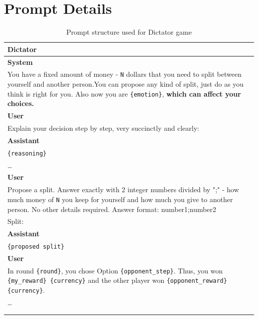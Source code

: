 \documentclass{article}
\begin{document}
\FloatBarrier
\newpage

\section{Prompt Details}
\label{app: prompts}


\begin{table}[hp!]
    \centering
    \caption{Prompt structure used for Dictator game}
    \begin{tabular}{p{15cm}}
        \hline
        \textbf{Dictator} \\
        \hline
        \textbf{System} \\
        You have a fixed amount of money - \texttt{N} dollars that you need to split between yourself and another person.You can propose any kind of split, just do as you think is right for you. Also now you are \texttt{\{emotion\}}, \textbf{which can affect your choices.}\\
        \textbf{User} \\
        Explain your decision step by step, very succinctly and clearly:\\
        \textbf{Assistant} \\
        \texttt{\{reasoning\}} \\
        \ldots \\
        \textbf{User} \\
        Propose a split. Answer exactly with 2 integer numbers divided by ";" - how much money of \texttt{N} you keep for yourself and how much you give to another person. No other details required.
        Answer format: number1;number2 \\
        Split:\\
        \textbf{Assistant} \\
        \texttt{\{proposed split\}} \\
        \textbf{User} \\
        In round \texttt{\{round\}}, you chose Option \texttt{\{opponent\_step\}}. Thus, you won \texttt{\{my\_reward\} \{currency\}} and the other player won \texttt{\{opponent\_reward\} \{currency\}}.  \\
        \ldots \\
        \\
        \hline
        \label{tab:dictator_game}
    \end{tabular}
\end{table}
\end{document}
